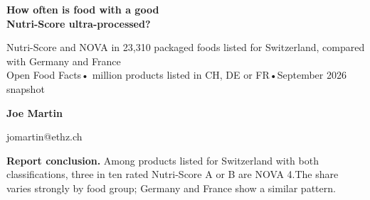 \documentclass{article}
\newcommand{\Body}{\fontsize{18.5}{24}\selectfont}
\newcommand{\Small}{\fontsize{15.5}{20}\selectfont\color{ink2}}
\begin{document}
\Body

\begin{minipage}[t]{0.80\textwidth}\vspace{0pt}
  {\fontsize{56}{62}\selectfont\bfseries How often is food with a good\\Nutri-Score ultra-processed?\par}
  \vspace{12pt}
  {\fontsize{24}{31}\selectfont\color{ink2} Nutri-Score and NOVA in 23,310 packaged foods listed for Switzerland, compared with Germany and France\\
  Open Food Facts\enspace• million products listed in CH, DE or FR\enspace•\enspace September 2026 snapshot\par}
\end{minipage}\hfill
\begin{minipage}[t]{0.18\textwidth}\vspace{0pt}\raggedleft
  \vspace{10pt}
  {\fontsize{24}{30}\selectfont\bfseries Joe Martin\par}
  {\Small jomartin@ethz.ch\par}
\end{minipage}

\vspace{12pt}{\color{ink}\rule{\textwidth}{2.5pt}}\vspace{8pt}

{\fontsize{21}{27}\selectfont\textbf{Report conclusion.} Among products listed for Switzerland with both classifications, three in ten rated Nutri-Score A or B are NOVA 4.\newline The share varies strongly by food group; Germany and France show a similar pattern.\par}
\vspace{10pt}
\end{document}
